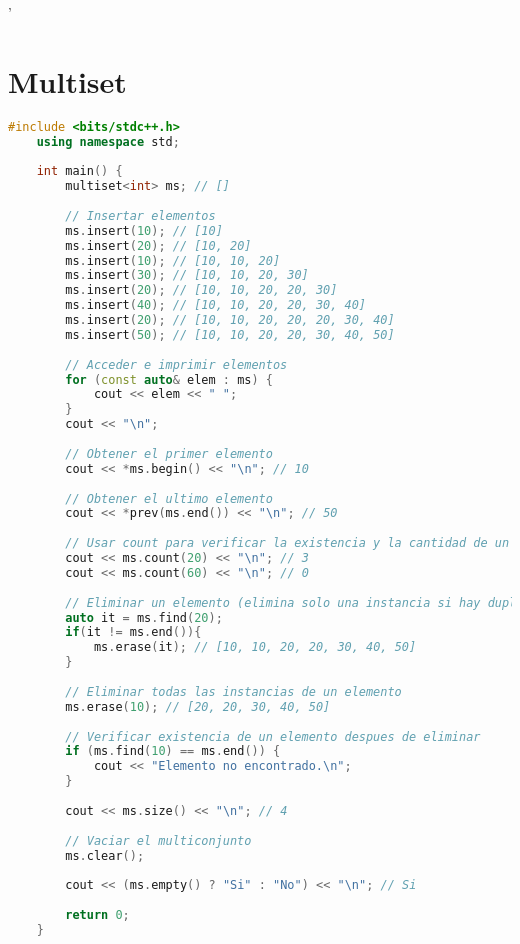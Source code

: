 
'\section*{Multiset}

\begin{lstlisting}[language=C++]
	#include <bits/stdc++.h>
	using namespace std;
	
	int main() {
		multiset<int> ms; // []
		
		// Insertar elementos
		ms.insert(10); // [10]
		ms.insert(20); // [10, 20]
		ms.insert(10); // [10, 10, 20]
		ms.insert(30); // [10, 10, 20, 30]
		ms.insert(20); // [10, 10, 20, 20, 30]
		ms.insert(40); // [10, 10, 20, 20, 30, 40]
		ms.insert(20); // [10, 10, 20, 20, 20, 30, 40]
		ms.insert(50); // [10, 10, 20, 20, 30, 40, 50]
		
		// Acceder e imprimir elementos
		for (const auto& elem : ms) {
			cout << elem << " ";
		}
		cout << "\n";
		
		// Obtener el primer elemento
		cout << *ms.begin() << "\n"; // 10
		
		// Obtener el ultimo elemento
		cout << *prev(ms.end()) << "\n"; // 50
		
		// Usar count para verificar la existencia y la cantidad de un elemento
		cout << ms.count(20) << "\n"; // 3
		cout << ms.count(60) << "\n"; // 0
		
		// Eliminar un elemento (elimina solo una instancia si hay duplicados)
		auto it = ms.find(20); 
		if(it != ms.end()){
			ms.erase(it); // [10, 10, 20, 20, 30, 40, 50]
		}
		
		// Eliminar todas las instancias de un elemento
		ms.erase(10); // [20, 20, 30, 40, 50]
		
		// Verificar existencia de un elemento despues de eliminar
		if (ms.find(10) == ms.end()) {
			cout << "Elemento no encontrado.\n"; 
		}
		
		cout << ms.size() << "\n"; // 4
		
		// Vaciar el multiconjunto
		ms.clear();
		
		cout << (ms.empty() ? "Si" : "No") << "\n"; // Si
		
		return 0;
	}
	
\end{lstlisting}
